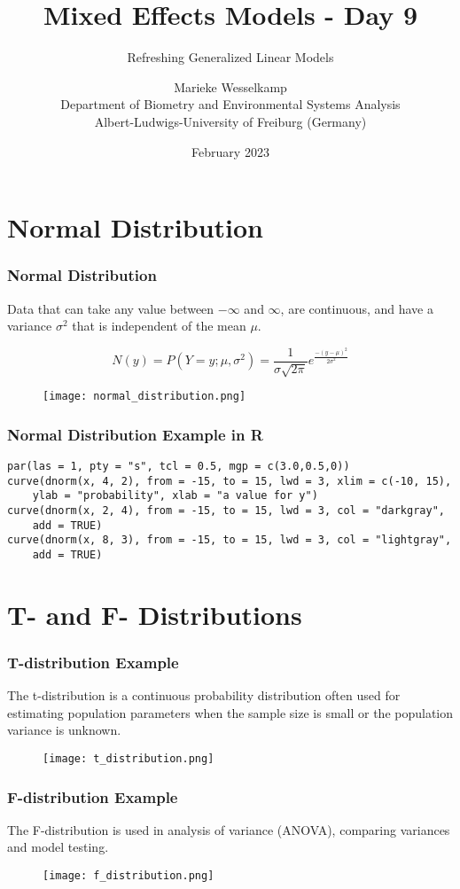\documentclass{beamer}
\title{Mixed Effects Models - Day 9}
\subtitle{Refreshing Generalized Linear Models}
\author{Marieke Wesselkamp\\Department of Biometry and Environmental Systems Analysis\\Albert-Ludwigs-University of Freiburg (Germany)}
\date{February 2023}
\begin{document}
\frame{\titlepage}

\section{Normal Distribution}

\begin{frame}
    \frametitle{Normal Distribution}
    Data that can take any value between $-\infty$ and $\infty$, are continuous, and have a variance $\sigma^2$ that is independent of the mean $\mu$.
    
    \[
    N(y) = P(Y = y; \mu, \sigma^2) = \frac{1}{\sigma \sqrt{2 \pi}} e^{\frac{-(y - \mu)^2}{2 \sigma^2}}
    \]
    
    \begin{figure}
        \centering
        \texttt{[image: normal\_distribution.png]}
    \end{figure}
\end{frame}

\begin{frame}[fragile]
    \frametitle{Normal Distribution Example in R}
    \lstset{style=Rstyle}
    \begin{lstlisting}
par(las = 1, pty = "s", tcl = 0.5, mgp = c(3.0,0.5,0))
curve(dnorm(x, 4, 2), from = -15, to = 15, lwd = 3, xlim = c(-10, 15), 
    ylab = "probability", xlab = "a value for y")
curve(dnorm(x, 2, 4), from = -15, to = 15, lwd = 3, col = "darkgray", 
    add = TRUE)
curve(dnorm(x, 8, 3), from = -15, to = 15, lwd = 3, col = "lightgray", 
    add = TRUE)
    \end{lstlisting}
\end{frame}

\section{T- and F- Distributions}

\begin{frame}
    \frametitle{T-distribution Example}
    The t-distribution is a continuous probability distribution often used for estimating population parameters when the sample size is small or the population variance is unknown.
    
    \begin{figure}
        \centering
        \texttt{[image: t\_distribution.png]}
    \end{figure}
\end{frame}

\begin{frame}
    \frametitle{F-distribution Example}
    The F-distribution is used in analysis of variance (ANOVA), comparing variances and model testing.
    
    \begin{figure}
        \centering
        \texttt{[image: f\_distribution.png]}
    \end{figure}
\end{frame}
\end{document}

